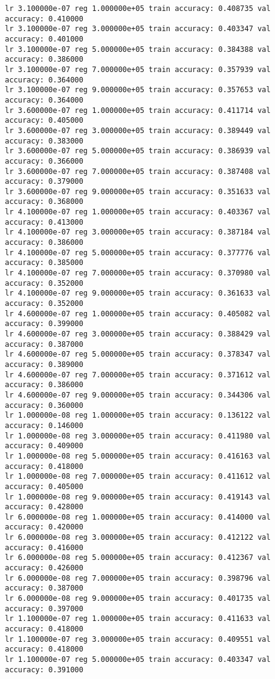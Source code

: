 \documentclass[11pt]{article}
\begin{document}
\begin{Verbatim}[commandchars=\\\{\}]
lr 3.100000e-07 reg 1.000000e+05 train accuracy: 0.408735 val accuracy: 0.410000
lr 3.100000e-07 reg 3.000000e+05 train accuracy: 0.403347 val accuracy: 0.401000
lr 3.100000e-07 reg 5.000000e+05 train accuracy: 0.384388 val accuracy: 0.386000
lr 3.100000e-07 reg 7.000000e+05 train accuracy: 0.357939 val accuracy: 0.364000
lr 3.100000e-07 reg 9.000000e+05 train accuracy: 0.357653 val accuracy: 0.364000
lr 3.600000e-07 reg 1.000000e+05 train accuracy: 0.411714 val accuracy: 0.405000
lr 3.600000e-07 reg 3.000000e+05 train accuracy: 0.389449 val accuracy: 0.383000
lr 3.600000e-07 reg 5.000000e+05 train accuracy: 0.386939 val accuracy: 0.366000
lr 3.600000e-07 reg 7.000000e+05 train accuracy: 0.387408 val accuracy: 0.379000
lr 3.600000e-07 reg 9.000000e+05 train accuracy: 0.351633 val accuracy: 0.368000
lr 4.100000e-07 reg 1.000000e+05 train accuracy: 0.403367 val accuracy: 0.413000
lr 4.100000e-07 reg 3.000000e+05 train accuracy: 0.387184 val accuracy: 0.386000
lr 4.100000e-07 reg 5.000000e+05 train accuracy: 0.377776 val accuracy: 0.385000
lr 4.100000e-07 reg 7.000000e+05 train accuracy: 0.370980 val accuracy: 0.352000
lr 4.100000e-07 reg 9.000000e+05 train accuracy: 0.361633 val accuracy: 0.352000
lr 4.600000e-07 reg 1.000000e+05 train accuracy: 0.405082 val accuracy: 0.399000
lr 4.600000e-07 reg 3.000000e+05 train accuracy: 0.388429 val accuracy: 0.387000
lr 4.600000e-07 reg 5.000000e+05 train accuracy: 0.378347 val accuracy: 0.389000
lr 4.600000e-07 reg 7.000000e+05 train accuracy: 0.371612 val accuracy: 0.386000
lr 4.600000e-07 reg 9.000000e+05 train accuracy: 0.344306 val accuracy: 0.360000
lr 1.000000e-08 reg 1.000000e+05 train accuracy: 0.136122 val accuracy: 0.146000
lr 1.000000e-08 reg 3.000000e+05 train accuracy: 0.411980 val accuracy: 0.409000
lr 1.000000e-08 reg 5.000000e+05 train accuracy: 0.416163 val accuracy: 0.418000
lr 1.000000e-08 reg 7.000000e+05 train accuracy: 0.411612 val accuracy: 0.405000
lr 1.000000e-08 reg 9.000000e+05 train accuracy: 0.419143 val accuracy: 0.428000
lr 6.000000e-08 reg 1.000000e+05 train accuracy: 0.414000 val accuracy: 0.420000
lr 6.000000e-08 reg 3.000000e+05 train accuracy: 0.412122 val accuracy: 0.416000
lr 6.000000e-08 reg 5.000000e+05 train accuracy: 0.412367 val accuracy: 0.426000
lr 6.000000e-08 reg 7.000000e+05 train accuracy: 0.398796 val accuracy: 0.387000
lr 6.000000e-08 reg 9.000000e+05 train accuracy: 0.401735 val accuracy: 0.397000
lr 1.100000e-07 reg 1.000000e+05 train accuracy: 0.411633 val accuracy: 0.418000
lr 1.100000e-07 reg 3.000000e+05 train accuracy: 0.409551 val accuracy: 0.418000
lr 1.100000e-07 reg 5.000000e+05 train accuracy: 0.403347 val accuracy: 0.391000

\end{Verbatim}
\end{document}
